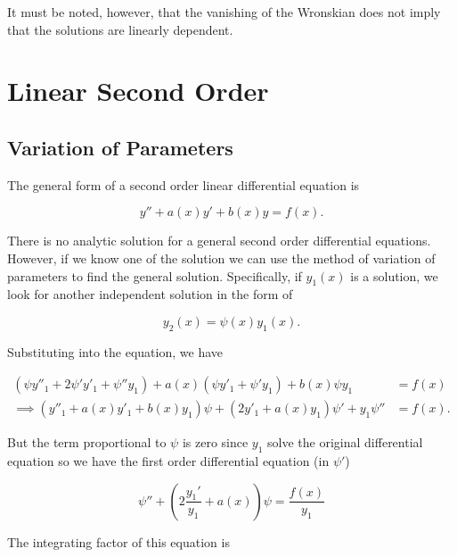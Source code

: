 \documentclass[english,a4paper,12pt]{report}
\begin{document}
It must be noted, however, that the vanishing of the Wronskian does not imply that the solutions are linearly dependent.

\section{Linear Second Order}

\subsection{Variation of Parameters}

The general form of a second order linear differential equation is

\begin{equation}
    y'' + a(x) y' + b(x)y = f(x).
\end{equation}

There is no analytic solution for a general second order differential equations. However, if we know one of the solution we can use the method of variation of parameters to find the general solution. Specifically, if \(y_1 (x)\) is a solution, we look for another independent solution in the form of

\begin{equation}
    y_{2} (x) = \psi (x) y_{1}(x).   
\end{equation}

Substituting into the equation, we have

\begin{equation}
    \begin{aligned}
     (\psi y''_{1} + 2\psi 'y'_{1} + \psi ''y_{1}) + a(x) (\psi y'_{1} + \psi ' y_{1}) + b(x) \psi y_{1} &= f(x) \\
    \implies ( y''_{1} + a(x) y'_{1} + b(x)y_{1}   ) \psi + (2 y'_{1} + a(x) y_{1}) \psi ' +  y_{1}\psi '' &= f(x). 
    \end{aligned}
\end{equation}

But the term proportional to \(\psi \) is zero since \(y_{1} \) solve the original differential equation so we have the first order differential equation (in \(\psi '\))

\begin{equation} \label{psi'} 
    \psi '' + \left( 2 \frac{y_1 '}{y_1 } + a(x)  \right) \psi = \frac{f(x)}{y_1} 
\end{equation}

The integrating factor of this equation is 
\end{document}
